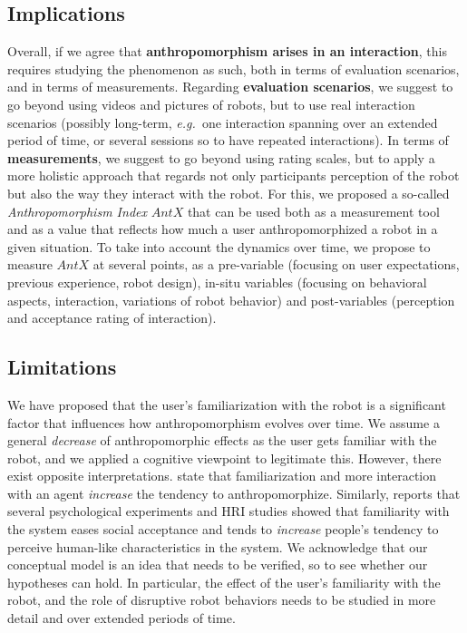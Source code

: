 \documentclass{frontiersSCNS} %
\newcommand{\eg}{{\textit{e.g.~}}}
\begin{document}
\subsection{Implications}

Overall, if we agree that \textbf{anthropomorphism arises in an interaction}, this requires studying the phenomenon as such, both in terms of evaluation scenarios, and in terms of measurements. Regarding \textbf{evaluation scenarios}, we suggest to go beyond using videos and pictures of robots, but to use real interaction scenarios (possibly long-term, \eg one interaction spanning over an extended period of time, or several sessions so to have repeated interactions). In terms of \textbf{measurements}, we suggest to go beyond using rating scales, but to apply a more holistic approach that regards not only participants perception of the robot but also the way they interact with the robot. For this, we proposed a so-called \textit{Anthropomorphism Index} $AntX$ that can be used both as a measurement tool and as a value that reflects how much a user anthropomorphized a robot in a given situation. To take into account the dynamics over time, we propose to measure $AntX$ at several points, as a pre-variable (focusing on user expectations, previous experience, robot design), in-situ variables (focusing on behavioral aspects, interaction, variations of robot behavior) and post-variables (perception and acceptance rating of interaction).  

\subsection{Limitations}

We have proposed that the user's familiarization with the robot is a significant factor that influences how anthropomorphism evolves over time. We assume a general \textit{decrease} of anthropomorphic effects as the user gets familiar with the robot, and we applied a cognitive viewpoint to legitimate this. However, there exist opposite interpretations. \cite{eddy_attribution_1993} state that familiarization and more interaction with an agent \textit{increase} the tendency to anthropomorphize. Similarly, \citep{duffy_anthropomorphism_2003} reports that several psychological experiments and HRI studies showed that familiarity with the system eases social acceptance and tends to \textit{increase} people's tendency to perceive human-like characteristics in the system.
We acknowledge that our conceptual model is an idea that needs to be verified, so to see whether our hypotheses can hold. In particular, the effect of the user's familiarity with the robot, and the role of disruptive robot behaviors needs to be studied in more detail and over extended periods of time.
\end{document}
